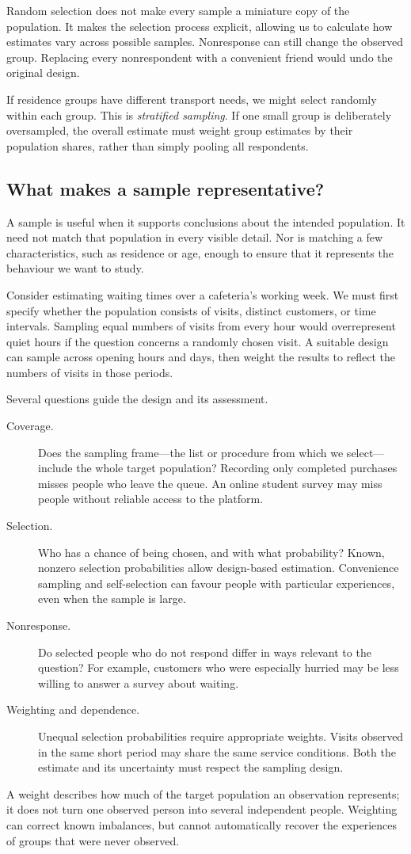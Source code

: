 Random selection does not make every sample a miniature copy of the
population. It makes the selection process explicit, allowing us to
calculate how estimates vary across possible samples. Nonresponse can
still change the observed group. Replacing every nonrespondent with a
convenient friend would undo the original design.

If residence groups have different transport needs, we might select
randomly within each group. This is \emph{stratified sampling}. If one
small group is deliberately oversampled, the overall estimate must weight
group estimates by their population shares, rather than simply pooling
all respondents.

\subsection{What makes a sample representative?}
A sample is useful when it supports conclusions about the intended
population. It need not match that population in every visible detail.
Nor is matching a few characteristics, such as residence or age, enough
to ensure that it represents the behaviour we want to study.

Consider estimating waiting times over a cafeteria's working week. We
must first specify whether the population consists of visits, distinct
customers, or time intervals. Sampling equal numbers of visits from every
hour would overrepresent quiet hours if the question concerns a randomly
chosen visit. A suitable design can sample across opening hours and days,
then weight the results to reflect the numbers of visits in those periods.

Several questions guide the design and its assessment.
\begin{description}
\item[Coverage.] Does the sampling frame---the list or procedure from which
we select---include the whole target population? Recording only completed
purchases misses people who leave the queue. An online student survey may
miss people without reliable access to the platform.
\item[Selection.] Who has a chance of being chosen, and with what probability?
Known, nonzero selection probabilities allow design-based estimation.
Convenience sampling and self-selection can favour people with particular
experiences, even when the sample is large.
\item[Nonresponse.] Do selected people who do not respond differ in ways
relevant to the question? For example, customers who were especially
hurried may be less willing to answer a survey about waiting.
\item[Weighting and dependence.] Unequal selection probabilities require
appropriate weights. Visits observed in the same short period may share
the same service conditions. Both the estimate and its uncertainty must
respect the sampling design.
\end{description}
A weight describes how much of the target population an observation
represents; it does not turn one observed person into several independent
people. Weighting can correct known imbalances, but cannot automatically
recover the experiences of groups that were never observed.

